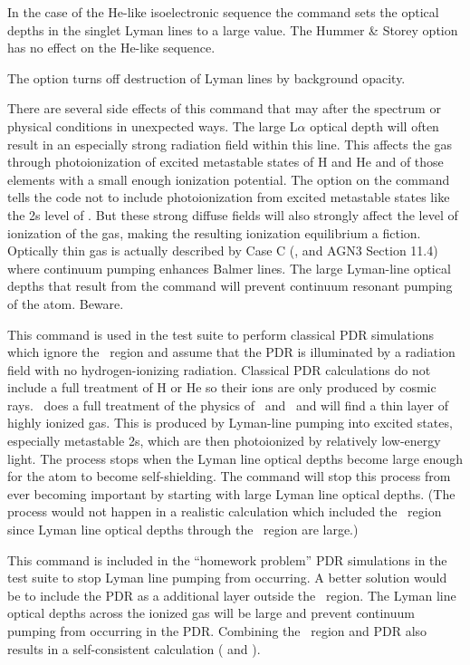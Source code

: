 In the case of the He-like isoelectronic sequence
the  command
sets the optical depths in the singlet Lyman lines to a large value.
The
Hummer \& Storey option has no effect on the He-like sequence.

The  option turns off destruction of
Lyman lines by background opacity.

There are several side effects of this command that may after the spectrum
or physical conditions in unexpected ways.
The large L$\alpha $ optical depth will
often result in an especially strong radiation field within this line.
This affects the gas through photoionization of excited metastable states
of H and He and of those elements
with a small enough ionization potential.
The  option on the 
command tells the code not to
include photoionization from excited metastable states like the 2s level
of \hO.
But these strong diffuse fields will also strongly affect the level
of ionization of the gas, making the resulting ionization equilibrium a
fiction.
Optically thin gas is actually described by Case C
(\citealp{Ferland1999}, \citealp{LuridianaEtAl09} and
AGN3 Section 11.4) where continuum pumping enhances Balmer lines.
The large
Lyman-line optical depths that result from the 
command will prevent
continuum resonant pumping of the atom.  Beware.

This command is used in the test suite to perform classical PDR
simulations which ignore the \hplus\ region and assume that the PDR is
illuminated by a radiation field with no hydrogen-ionizing radiation.
Classical PDR calculations do not include a full treatment of H or He so
their ions are only produced by cosmic rays.
\Cloudy\ does a full treatment
of the physics of \hO\ and \heO\
and will find a thin layer of highly ionized
gas.
This is produced by Lyman-line pumping into excited states, especially
metastable 2s, which are then photoionized by relatively low-energy light.
The process stops when the Lyman line optical depths become large enough
for the atom to become self-shielding.
The  command will stop this
process from ever becoming important by starting with large Lyman line
optical depths.
(The process would not happen in a realistic calculation
which included the \hplus\ region since Lyman line optical depths
through the \hplus\ region are large.)

This command is included in the ``homework problem'' PDR simulations
in the test suite to
stop Lyman line pumping from occurring.
A better solution would be to include
the PDR as a additional layer outside the \hplus\ region.
The Lyman line
optical depths across the ionized gas will be large and prevent continuum
pumping from occurring in the PDR.
Combining the \hii\ region and PDR also
results in a self-consistent calculation
(\citealp{Abel2005} and \citealp{Abel2008} ).

